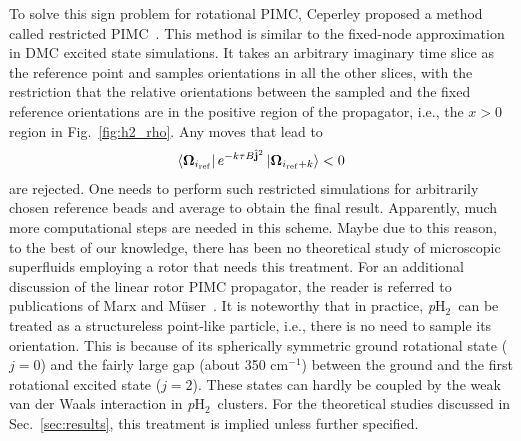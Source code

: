 \documentclass[12pt]{iopart}
\newcommand{\wno}{cm$^{-1}$}
\newcommand{\phtwo}{{\em p}H$_2$}
\begin{document}
To solve this sign problem for rotational PIMC, Ceperley proposed a method called restricted PIMC~\cite{ceperley_pimc_fermions}. This method is similar to the fixed-node approximation in DMC excited state simulations. It takes an arbitrary imaginary time slice as the reference point and samples orientations in all the other slices, with the restriction that the relative orientations between the sampled and the fixed reference orientations are in the positive region of the propagator, i.e., the $x>0$ region in Fig.~\ref{fig:h2_rho}. 
Any moves that lead to
\begin{eqnarray}
\left<{\bf \Omega}_{i_{\rm ref}}\right| e^{ -k\tau B \hat{{\bf j}}^2 }\left| {\bf \Omega}_{i_{\rm ref}+k} \right><0
\end{eqnarray}
are rejected. 
One needs to perform such restricted simulations for arbitrarily chosen reference beads and average to obtain the final result. 
Apparently, much more computational steps are needed in this scheme. 
Maybe due to this reason, to the best of our knowledge, there has been no theoretical study of  microscopic superfluids employing a rotor that needs this treatment. 
For an additional discussion of the linear rotor PIMC propagator, the reader is referred to publications of Marx and M\"user~\cite{marx_line_rot_pimc,muser_line_rot_pimc,marx_muser_rot_pimc}. 
It is noteworthy that in practice, \phtwo~can be treated as a structureless point-like particle, i.e., there is no need to sample its orientation. 
This is because of its spherically symmetric ground rotational state ($j=0$) and the fairly large gap (about 350 \wno) between the ground and the first rotational excited state ($j=2$). 
These states can hardly be coupled by the weak van der Waals interaction in \phtwo~clusters. For the theoretical studies discussed in Sec.~\ref{sec:results}, this treatment is implied unless further specified.
\end{document}
